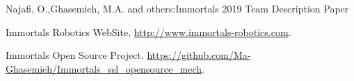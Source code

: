 \documentclass[runningheads]{llncs}
\begin{document}
%
%
%
% 
% 
%

\newpage
\begin{thebibliography}{8}
Najafi, O.,Ghasemieh, M.A. and others:Immortals 2019 Team Description Paper

Immortals Robotics WebSite, \url{http://www.immortals-robotics.com}.

Immortals Open Source Project. \url{https://github.com/Ma-Ghasemieh/Immortals\_ssl\_opensource\_mech}.

%
%
%

\end{thebibliography}
\end{document}
